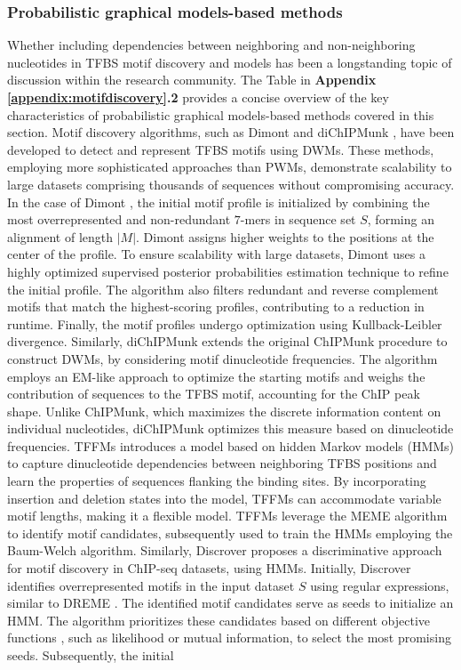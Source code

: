 \documentclass[a4paper, titlepage, openright]{book}
\begin{document}
\subsubsection{Probabilistic graphical models-based methods}
Whether including dependencies between neighboring and non-neighboring nucleotides in TFBS motif discovery and models has been a longstanding topic of discussion within the research community. The Table in \textbf{Appendix \ref{appendix:motifdiscovery}.2} provides a concise overview of the key characteristics of probabilistic graphical models-based methods covered in this section. Motif discovery algorithms, such as Dimont \citep{grau2013general} and diChIPMunk \citep{kulakovskiy2013binding}, have been developed to detect and represent TFBS motifs using DWMs. These methods, employing more sophisticated approaches than PWMs, demonstrate scalability to large datasets comprising thousands of sequences without compromising accuracy. In the case of Dimont \citep{grau2013general}, the initial motif profile is initialized by combining the most overrepresented and non-redundant $7$-mers in sequence set $S$, forming an alignment of length $|M|$. Dimont assigns higher weights to the positions at the center of the profile. To ensure scalability with large datasets, Dimont uses a highly optimized supervised posterior probabilities estimation technique to refine the initial profile. The algorithm also filters redundant and reverse complement motifs that match the highest-scoring profiles, contributing to a reduction in runtime. Finally, the motif profiles undergo optimization using Kullback-Leibler divergence. Similarly, diChIPMunk \citep{kulakovskiy2013binding} extends the original ChIPMunk \citep{kulakovskiy2010deep} procedure to construct DWMs, by considering motif dinucleotide frequencies. The algorithm employs an EM-like approach to optimize the starting motifs and weighs the contribution of sequences to the TFBS motif, accounting for the ChIP peak shape. Unlike ChIPMunk, which maximizes the discrete information content on individual nucleotides, diChIPMunk optimizes this measure based on dinucleotide frequencies. TFFMs \citep{mathelier2013next} introduces a model based on hidden Markov models (HMMs) to capture dinucleotide dependencies between neighboring TFBS positions and learn the properties of sequences flanking the binding sites. By incorporating insertion and deletion states into the model, TFFMs can accommodate variable motif lengths, making it a flexible model. TFFMs leverage the MEME algorithm \citep{bailey1994fitting,bailey1995value,bailey2006meme} to identify motif candidates, subsequently used to train the HMMs employing the Baum-Welch algorithm. Similarly, Discrover \citep{maaskola2014binding} proposes a discriminative approach for motif discovery in ChIP-seq datasets, using HMMs. Initially, Discrover identifies overrepresented motifs in the input dataset $S$ using regular expressions, similar to DREME \citep{bailey2011dreme}. The identified motif candidates serve as seeds to initialize an HMM. The algorithm prioritizes these candidates based on different objective functions \citep{maaskola2014binding}, such as likelihood or mutual information, to select the most promising seeds. Subsequently, the initial 
\end{document}

